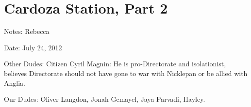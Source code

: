 \setcounter{chapter}{ 3 }
\chapter{\textbf{Cardoza Station, Part 2} }






Notes: Rebecca

Date: July 24, 2012

\noindent\hrulefill





Other Dudes:  Citizen Cyril Magnin: He is pro-Directorate and isolationist, believes Directorate should not have gone to war with Nicklepan or be allied with Anglia.



Our Dudes: Oliver Langdon, Jonah Gemayel, Jaya Parvadi, Hayley.



